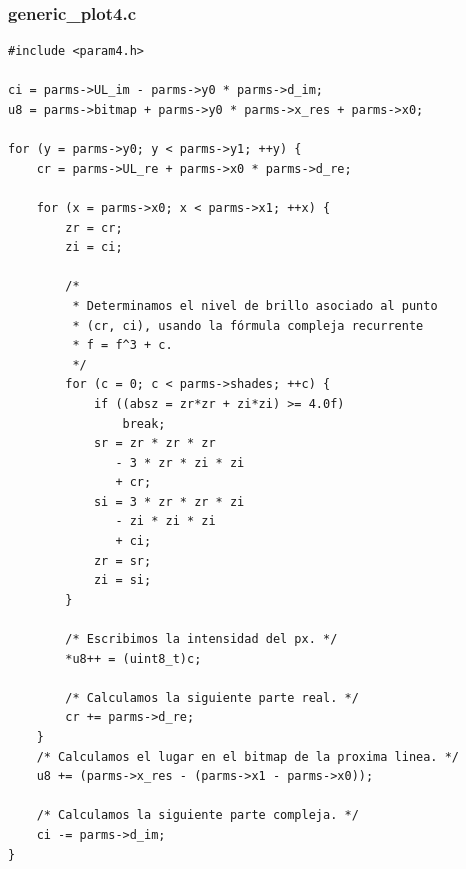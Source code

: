 \documentclass[a4paper,10pt]{article}
\begin{document}
\subsubsection{generic_plot4.c}
\begin{verbatim}
#include <param4.h>

ci = parms->UL_im - parms->y0 * parms->d_im;
u8 = parms->bitmap + parms->y0 * parms->x_res + parms->x0;

for (y = parms->y0; y < parms->y1; ++y) {
	cr = parms->UL_re + parms->x0 * parms->d_re;

	for (x = parms->x0; x < parms->x1; ++x) {
		zr = cr;
		zi = ci;

		/*
		 * Determinamos el nivel de brillo asociado al punto
		 * (cr, ci), usando la fórmula compleja recurrente 
		 * f = f^3 + c.
		 */
		for (c = 0; c < parms->shades; ++c) {
			if ((absz = zr*zr + zi*zi) >= 4.0f)
				break;
			sr = zr * zr * zr
			   - 3 * zr * zi * zi
			   + cr;
			si = 3 * zr * zr * zi
			   - zi * zi * zi
			   + ci;
			zr = sr;
			zi = si;
		}

		/* Escribimos la intensidad del px. */
		*u8++ = (uint8_t)c;

		/* Calculamos la siguiente parte real. */
		cr += parms->d_re;
	}
	/* Calculamos el lugar en el bitmap de la proxima linea. */
	u8 += (parms->x_res - (parms->x1 - parms->x0));

	/* Calculamos la siguiente parte compleja. */
	ci -= parms->d_im;
}

\end{verbatim}
\end{document}
